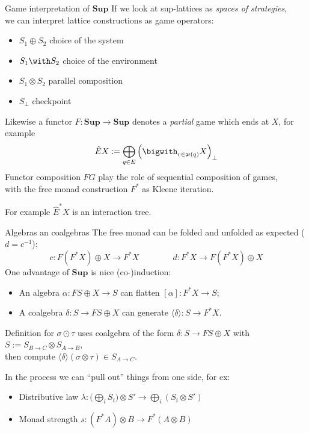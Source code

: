 \documentclass[aspectratio=1610]{beamer}
\begin{document}
\begin{frame}{Game interpretation of $\mathbf{Sup}$}
If we look at sup-lattices as \emph{spaces of strategies}, \\
we can interpret lattice constructions as game operators:
\begin{itemize}
  \item $S_1 \oplus S_2$ choice of the system
  \item $S_1 \with S_2$ choice of the environment
  \item $S_1 \otimes S_2$ parallel composition
  \item $S_\bot$ checkpoint
\end{itemize}

\vfill
Likewise a functor $F : \mathbf{Sup} \rightarrow \mathbf{Sup}$
denotes a \emph{partial} game which ends at $X$,
for example
\[
  \hat{E} X := \bigoplus_{q \in E}
    \Big( \bigwith_{r \in \mathsf{ar}(q)} X \Big)_\bot
\]
Functor composition $FG$ play the role of sequential composition of games, \\
with the free monad construction $F^*$ as Kleene iteration.

\vfill
For example $\hat{E}^* X$ is an interaction tree.
\end{frame}

\begin{frame}{Algebras an coalgebras}
The free monad can be folded and unfolded as expected ($d = c^{-1}$):
\[
  c : F( F^* X ) \oplus X \rightarrow F^*X
  \qquad \qquad
  d : F^*X \rightarrow F(F^*X) \oplus X
\]
One advantage of $\mathbf{Sup}$ is nice (co-)induction:
\begin{itemize}
  \item An algebra $\alpha : F S \oplus X \rightarrow S$
    can flatten $[\alpha] : F^* X \rightarrow S$;
  \item A coalgebra $\delta : S \rightarrow F S \oplus X$
    can generate $\langle \delta \rangle : S \rightarrow F^*X$.
\end{itemize}

\vfill
Definition for $\sigma \odot \tau$
uses coalgebra of the form
$\delta : S \rightarrow F S \oplus X$
with $S := S_{B \rightarrow C} \otimes S_{A \rightarrow B}$, \\
then compute $\langle \delta \rangle(\sigma \otimes \tau) \in S_{A \rightarrow C}$.

\vfill
In the process we can ``pull out'' things from one side, for ex:
\begin{itemize}
  \item Distributive law $\lambda : \Big(\bigoplus_i S_i \Big) \otimes S' \rightarrow
    \bigoplus_i (S_i \otimes S')$
  \item Monad strength $s : (F^* A) \otimes B \rightarrow F^* (A \otimes B)$
\end{itemize}
\end{frame}
\end{document}
